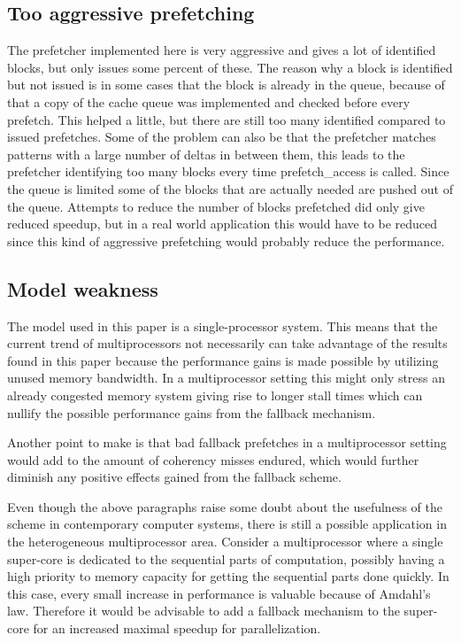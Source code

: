 \documentclass[12pt,journal,compsoc]{IEEEtran}
\begin{document}
\subsection{Too aggressive prefetching}
The prefetcher implemented here is very aggressive and gives a lot of
identified blocks, but only issues some percent of these. The reason why a
block is identified but not issued is in some cases that the block is already
in the queue, because of that a copy of the cache queue was implemented
and checked before every prefetch. This helped a little, but there are still
too many identified compared to issued prefetches. Some of the problem can
also be that the prefetcher matches patterns with a large number of deltas
in between them, this leads to the prefetcher identifying too many blocks every
time prefetch\_access is called. Since the queue is limited some of the
blocks that are actually needed are pushed out of the queue. Attempts to
reduce the number of blocks prefetched did only give reduced speedup, but
in a real world application this would have to be reduced since this kind of
aggressive prefetching would probably reduce the performance.

\subsection{Model weakness}
The model used in this paper is a single-processor system.
This means that the current trend of multiprocessors not
necessarily can take advantage of the results found in
this paper because the performance gains is made possible
by utilizing unused memory bandwidth. In a multiprocessor
setting this might only stress an already congested memory
system giving rise to longer stall times which can nullify
the possible performance gains from the fallback mechanism.

Another point to make is that bad fallback prefetches in a
multiprocessor setting would add to the amount of coherency
misses endured, which would further diminish any positive
effects gained from the fallback scheme.

Even though the above paragraphs raise some doubt about
the usefulness of the scheme in contemporary computer systems,
there is still a possible application in the heterogeneous
multiprocessor area. Consider a multiprocessor where a single super-core
is dedicated to the sequential parts of computation, possibly having a
high priority to memory capacity for getting the sequential parts done quickly.
In this case, every small increase in performance is valuable
because of Amdahl's law. Therefore it would be advisable to add
a fallback mechanism to the super-core for an increased maximal
speedup for parallelization.
\end{document}
